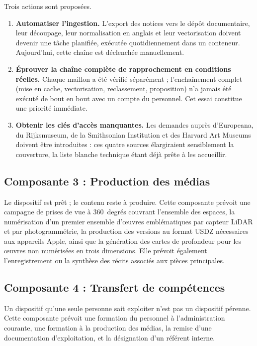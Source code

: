 Trois actions sont proposées.

\begin{enumerate}
  \item \textbf{Automatiser l'ingestion.} L'export des notices vers le dépôt
        documentaire, leur découpage, leur normalisation en anglais et leur
        vectorisation doivent devenir une tâche planifiée, exécutée
        quotidiennement dans un conteneur. Aujourd'hui, cette chaîne est
        déclenchée manuellement.

  \item \textbf{Éprouver la chaîne complète de rapprochement en conditions
        réelles.} Chaque maillon a été vérifié séparément ; l'enchaînement
        complet (mise en cache, vectorisation, reclassement, proposition) n'a jamais été exécuté de bout en bout avec un compte du personnel. Cet
        essai constitue une priorité immédiate.

  \item \textbf{Obtenir les clés d'accès manquantes.} Les demandes auprès
        d'Europeana, du Rijksmuseum, de la Smithsonian Institution et des
        Harvard Art Museums doivent être introduites : ces quatre sources
        élargiraient sensiblement la couverture, la liste blanche technique
        étant déjà prête à les accueillir.
\end{enumerate}

\subsection{Composante 3 : Production des médias}

Le dispositif est prêt ; le contenu reste à produire. Cette composante prévoit
une campagne de prises de vue à 360~degrés couvrant l'ensemble des espaces, la
numérisation d'un premier ensemble d'œuvres emblématiques par capteur LiDAR et
par photogrammétrie, la production des versions au format USDZ nécessaires aux
appareils Apple, ainsi que la génération des cartes de profondeur pour les
œuvres non numérisées en trois dimensions. Elle prévoit également
l'enregistrement ou la synthèse des récits associés aux pièces principales.

\subsection{Composante 4 : Transfert de compétences}

Un dispositif qu'une seule personne sait exploiter n'est pas un dispositif
pérenne. Cette composante prévoit une formation du personnel à l'administration
courante, une formation à la production des médias, la remise d'une
documentation d'exploitation, et la désignation d'un référent interne.


